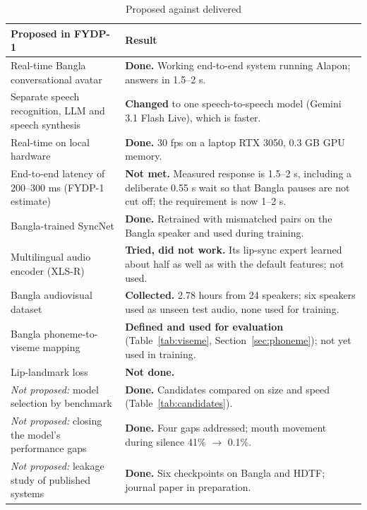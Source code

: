 \begin{table}[H]
\centering
\caption{Proposed against delivered}
\label{tab:delivered}
\renewcommand{\arraystretch}{1.3}
\begin{tabular}{|p{5.2cm}|p{8.3cm}|}
\hline
\textbf{Proposed in FYDP-1} & \textbf{Result} \\
\hline
Real-time Bangla conversational avatar & \textbf{Done.} Working end-to-end system running Alapon; answers in 1.5--2 s. \\
\hline
Separate speech recognition, LLM and speech synthesis & \textbf{Changed} to one speech-to-speech model (Gemini 3.1 Flash Live), which is faster. \\
\hline
Real-time on local hardware & \textbf{Done.} 30 fps on a laptop RTX 3050, 0.3 GB GPU memory. \\
\hline
End-to-end latency of 200--300 ms (FYDP-1 estimate) & \textbf{Not met.} Measured response is 1.5--2 s, including a deliberate 0.55 s wait so that Bangla pauses are not cut off; the requirement is now 1--2 s. \\
\hline
Bangla-trained SyncNet & \textbf{Done.} Retrained with mismatched pairs on the Bangla speaker and used during training. \\
\hline
Multilingual audio encoder (XLS-R) & \textbf{Tried, did not work.} Its lip-sync expert learned about half as well as with the default features; not used. \\
\hline
Bangla audiovisual dataset & \textbf{Collected.} 2.78 hours from 24 speakers; six speakers used as unseen test audio, none used for training. \\
\hline
Bangla phoneme-to-viseme mapping & \textbf{Defined and used for evaluation} (Table~\ref{tab:viseme}, Section~\ref{sec:phoneme}); not yet used in training. \\
\hline
Lip-landmark loss & \textbf{Not done.} \\
\hline
\textit{Not proposed:} model selection by benchmark & \textbf{Done.} Candidates compared on size and speed (Table~\ref{tab:candidates}). \\
\hline
\textit{Not proposed:} closing the model's performance gaps & \textbf{Done.} Four gaps addressed; mouth movement during silence 41\% $\rightarrow$ 0.1\%. \\
\hline
\textit{Not proposed:} leakage study of published systems & \textbf{Done.} Six checkpoints on Bangla and HDTF; journal paper in preparation. \\
\hline
\end{tabular}
\end{table}

